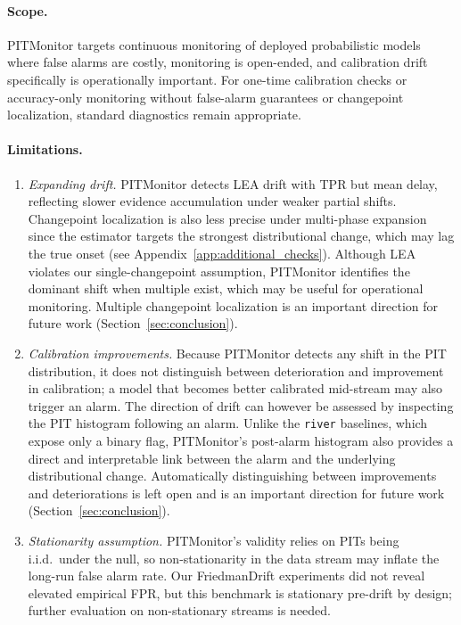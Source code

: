 \documentclass[ejsv2, noshowframe]{imsart}
\theoremstyle{plain}
\theoremstyle{definition}
\theoremstyle{remark}
\begin{document}
\paragraph{Scope.}
PITMonitor targets continuous monitoring of deployed probabilistic models where false alarms are costly, monitoring is open-ended, and calibration drift specifically is operationally important. For one-time calibration checks or accuracy-only monitoring without false-alarm guarantees or changepoint localization, standard diagnostics remain appropriate.

\paragraph{Limitations.}\label{par:limitations}

\begin{enumerate}\setlength{\itemsep}{5.5pt}
 \item \textit{Expanding drift.} PITMonitor detects LEA drift with \resPMLEATPR{} TPR but \resPMLEADelay{} mean delay, reflecting slower evidence accumulation under weaker partial shifts. Changepoint localization is also less precise under multi-phase expansion since the estimator targets the strongest distributional change, which may lag the true onset (see Appendix~\ref{app:additional_checks}). Although LEA violates our single-changepoint assumption, PITMonitor identifies the dominant shift when multiple exist, which may be useful for operational monitoring. Multiple changepoint localization is an important direction for future work (Section~\ref{sec:conclusion}).

 \item \textit{Calibration improvements.} Because PITMonitor detects any shift in the PIT distribution, it does not distinguish between deterioration and improvement in calibration; a model that becomes better calibrated mid-stream may also trigger an alarm. The direction of drift can however be assessed by inspecting the PIT histogram following an alarm. Unlike the \texttt{river} baselines, which expose only a binary flag, PITMonitor's post-alarm histogram also provides a direct and interpretable link between the alarm and the underlying distributional change. Automatically distinguishing between improvements and deteriorations is left open and is an important direction for future work (Section~\ref{sec:conclusion}).

 \item \textit{Stationarity assumption.} PITMonitor's validity relies on PITs being i.i.d.\ under the null, so non-stationarity in the data stream may inflate the long-run false alarm rate. Our FriedmanDrift experiments did not reveal elevated empirical FPR, but this benchmark is stationary pre-drift by design; further evaluation on non-stationary streams is needed.
 

\end{enumerate}
\end{document}

